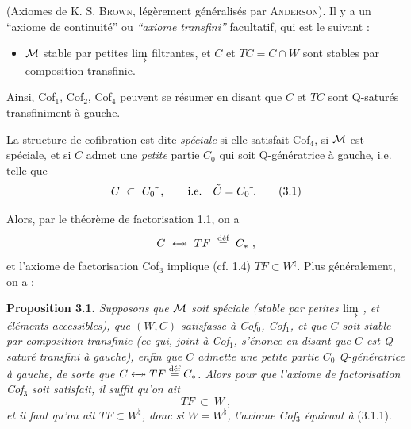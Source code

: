(Axiomes de K. S. \textsc{Brown}, légèrement généralisés par \textsc{Anderson}). Il y a un ``axiome
de continuité'' ou \textit{``axiome transfini''} facultatif, qui est le suivant :

\begin{itemize}[leftmargin=4em,labelwidth=3.5em,align=left]
\item[Cof$_4$ :] $\M$ stable par petites $\varinjlim$ filtrantes, et $C$ et $TC = C\cap W$ sont stables par composition transfinie.
\end{itemize}

Ainsi, Cof$_1$, Cof$_2$, Cof$_4$ peuvent se résumer en disant que $C$ et $TC$ sont Q-saturés transfiniment à gauche.

La structure de cofibration est dite \textit{spéciale} si elle satisfait Cof$_4$, si $\M$ est spéciale, et si $C$ admet une \textit{petite} partie $C_0$ qui soit Q-génératrice à gauche, i.e. telle que
\[
C \ \subset\ C_0\Qs\,, \qquad \text{i.e.}\quad \tilde{C}=C_0\Qs. \tag*{(3.1)}
\]

Alors, par le théorème de factorisation 1.1, on a
\[
C \ \fact\ TF \ \deq\ C_* \ ,
\]
et l'axiome de factorisation Cof$_3$ implique (cf. 1.4) $TF\subset W^{\natural}$. Plus généralement, on a :

\textbf{Proposition 3.1.} \textit{Supposons que $\M$ soit spéciale (stable par petites $\varinjlim$ , et éléments accessibles), que $(W,C)$ satisfasse à Cof$_0$, Cof$_1$, et que $C$ soit stable par composition transfinie (ce qui, joint à Cof$_1$, s'énonce en disant que $C$ est Q-saturé transfini à gauche), enfin que $C$ admette une petite partie $C_0$ Q-génératrice à gauche, de sorte que $C\fact TF\deq C_*$. Alors pour que l'axiome de factorisation Cof$_3$ soit satisfait, il suffit qu'on ait}
\[
TF \ \subset\ W \ , \tag*{(3.1.1)}
\]
\textit{et il faut qu'on ait $TF\subset W^{\natural}$, donc si $W=W^{\natural}$, l'axiome Cof$_3$ équivaut à} (3.1.1).


